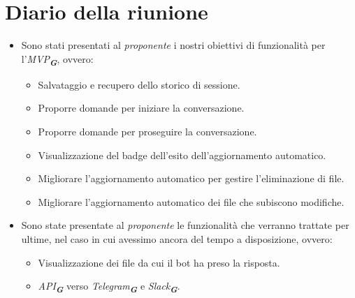 
\section{Diario della riunione}

\begin{itemize}
    \item Sono stati presentati al \emph{proponente} i nostri obiettivi di funzionalità per l'\emph{MVP}\textsubscript{\textbf{\textit{G}}}, ovvero: 
        \begin{itemize}
            \item Salvataggio e recupero dello storico di sessione.
            \item Proporre domande per iniziare la conversazione.
            \item Proporre domande per proseguire la conversazione.
            \item Visualizzazione del badge dell’esito dell’aggiornamento automatico.
            \item Migliorare l’aggiornamento automatico per gestire l’eliminazione di file.
            \item Migliorare l’aggiornamento automatico dei file che subiscono modifiche.
        \end{itemize}
    \item Sono state presentate al \emph{proponente} le funzionalità che verranno trattate per ultime, nel caso in cui avessimo ancora del tempo a disposizione, ovvero:
        \begin{itemize}
            \item Visualizzazione dei file da cui il bot ha preso la risposta.
            \item \emph{API}\textsubscript{\textbf{\textit{G}}} verso \emph{Telegram}\textsubscript{\textbf{\textit{G}}} e \emph{Slack}\textsubscript{\textbf{\textit{G}}}.
        \end{itemize}


\end{itemize}
